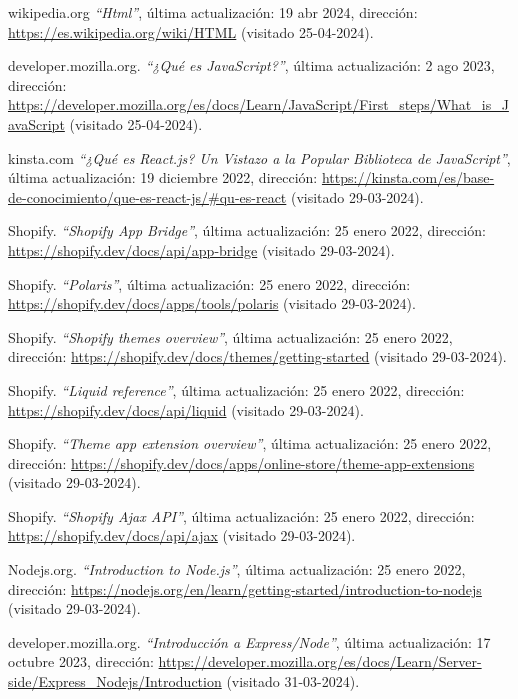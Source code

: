 \documentclass[11pt]{article}
\begin{document}
\begin{thebibliography}{100}
    wikipedia.org
    \textit{``Html''}, última actualización: 19 abr 2024, dirección: \url{https://es.wikipedia.org/wiki/HTML} (visitado 25-04-2024).

    developer.mozilla.org.
    \textit{``¿Qué es JavaScript?''}, última actualización: 2 ago 2023, dirección: \url{https://developer.mozilla.org/es/docs/Learn/JavaScript/First_steps/What_is_JavaScript} (visitado 25-04-2024).

    kinsta.com
    \textit{``¿Qué es React.js? Un Vistazo a la Popular Biblioteca de JavaScript''}, última actualización: 19 diciembre 2022, dirección: \url{https://kinsta.com/es/base-de-conocimiento/que-es-react-js/#qu-es-react} (visitado 29-03-2024).

    Shopify.
    \textit{``Shopify App Bridge''}, última actualización: 25 enero 2022, dirección: \url{https://shopify.dev/docs/api/app-bridge} (visitado 29-03-2024).

    Shopify.
    \textit{``Polaris''}, última actualización: 25 enero 2022, dirección: \url{https://shopify.dev/docs/apps/tools/polaris} (visitado 29-03-2024).

    Shopify.
    \textit{``Shopify themes overview''}, última actualización: 25 enero 2022, dirección: \url{https://shopify.dev/docs/themes/getting-started} (visitado 29-03-2024).

    Shopify.
    \textit{``Liquid reference''}, última actualización: 25 enero 2022, dirección: \url{https://shopify.dev/docs/api/liquid} (visitado 29-03-2024).

    Shopify.
    \textit{``Theme app extension overview''}, última actualización: 25 enero 2022, dirección: \url{https://shopify.dev/docs/apps/online-store/theme-app-extensions} (visitado 29-03-2024).

    Shopify.
    \textit{``Shopify Ajax API''}, última actualización: 25 enero 2022, dirección: \url{https://shopify.dev/docs/api/ajax} (visitado 29-03-2024).

    Nodejs.org.
    \textit{``Introduction to Node.js''}, última actualización: 25 enero 2022, dirección: \url{https://nodejs.org/en/learn/getting-started/introduction-to-nodejs} (visitado 29-03-2024).

    developer.mozilla.org.
    \textit{``Introducción a Express/Node''}, última actualización: 17 octubre 2023, dirección: \url{https://developer.mozilla.org/es/docs/Learn/Server-side/Express_Nodejs/Introduction} (visitado 31-03-2024).


\end{thebibliography}
\end{document}
